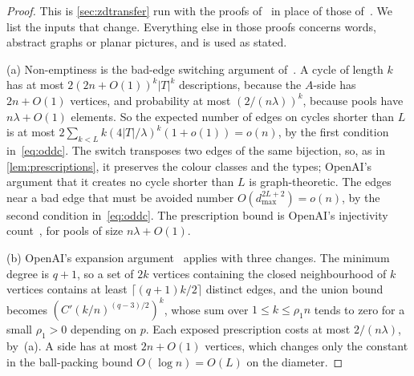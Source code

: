 \documentclass[11pt]{article}
\theoremstyle{definition}
\theoremstyle{plain}
\begin{document}
\begin{proof}
This is \cref{sec:zdtransfer} run with the proofs of~\cite{OAI197a} in place of those of~\cite{OAI196}. We list the inputs that change. Everything else in those proofs concerns words, abstract graphs or planar pictures, and is used as stated.

(a) Non-emptiness is the bad-edge switching argument of~\cite[\S3.3]{OAI197a}. A cycle of length $k$ has at most $2(2n+O(1))^k|T|^k$ descriptions, because the $A$-side has $2n+O(1)$ vertices, and probability at most $(2/(n\lambda))^k$, because pools have $n\lambda+O(1)$ elements. So the expected number of edges on cycles shorter than $L$ is at most $2\sum_{k<L}k(4|T|/\lambda)^k(1+o(1))=o(n)$, by the first condition in~\eqref{eq:oddc}. The switch transposes two edges of the same bijection, so, as in \cref{lem:prescriptions}, it preserves the colour classes and the types; OpenAI's argument that it creates no cycle shorter than $L$ is graph-theoretic. The edges near a bad edge that must be avoided number $O(d_{\max}^{2L+2})=o(n)$, by the second condition in~\eqref{eq:oddc}. The prescription bound is OpenAI's injectivity count~\cite[Lemma~3.3]{OAI197a}, for pools of size $n\lambda+O(1)$.

(b) OpenAI's expansion argument~\cite[Prop.~3.4]{OAI197a} applies with three changes. The minimum degree is $q+1$, so a set of $2k$ vertices containing the closed neighbourhood of $k$ vertices contains at least $\lceil(q+1)k/2\rceil$ distinct edges, and the union bound becomes $(C'(k/n)^{(q-3)/2})^k$, whose sum over $1\le k\le\rho_1n$ tends to zero for a small $\rho_1>0$ depending on $p$. Each exposed prescription costs at most $2/(n\lambda)$, by~(a). A side has at most $2n+O(1)$ vertices, which changes only the constant in the ball-packing bound $O(\log n)=O(L)$ on the diameter.


\end{proof}
\end{document}
